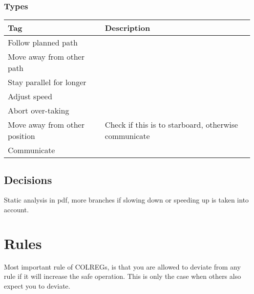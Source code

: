 \subsubsection{Types}
\begin{table}[h]
	\begin{tabular}{l|l}
		\toprule
		Tag & Description\\
		\midrule
		Follow planned path & \\
		Move away from other path & \\
		Stay parallel for longer & \\
		Adjust speed & \\
		Abort over-taking & \\
		Move away from other position & Check if this is to starboard, otherwise communicate \\
		Communicate & \\
		\bottomrule
	\end{tabular}
	
	\label{tab:strategies}
\end{table}

\subsection{Decisions}
Static analysis in pdf, more branches if slowing down or speeding up is taken into account.


\section{Rules}
Most important rule of \ac{COLREGs}, is that you are allowed to deviate from any rule if it will increase the safe operation. This is only the case when others also expect you to deviate.




